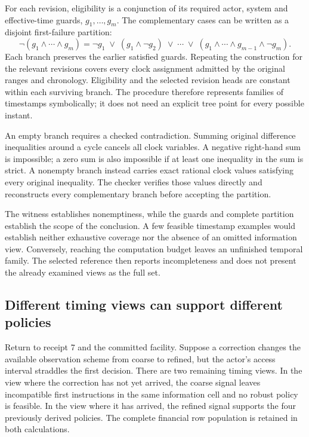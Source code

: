 For each revision, eligibility is a conjunction of its required actor, system and effective-time guards, $g_1,\ldots,g_m$. The complementary cases can be written as a disjoint first-failure partition:
\begin{equation}
 \neg(g_1\land\cdots\land g_m)
 =\neg g_1\;\lor\;(g_1\land\neg g_2)\;\lor\;\cdots\;\lor\;
 (g_1\land\cdots\land g_{m-1}\land\neg g_m).
 \label{eq:temporal-first-failure}
\end{equation}
Each branch preserves the earlier satisfied guards. Repeating the construction for the relevant revisions covers every clock assignment admitted by the original ranges and chronology. Eligibility and the selected revision heads are constant within each surviving branch. The procedure therefore represents families of timestamps symbolically; it does not need an explicit tree point for every possible instant.

An empty branch requires a checked contradiction. Summing original difference inequalities around a cycle cancels all clock variables. A negative right-hand sum is impossible; a zero sum is also impossible if at least one inequality in the sum is strict. A nonempty branch instead carries exact rational clock values satisfying every original inequality. The checker verifies those values directly and reconstructs every complementary branch before accepting the partition.

The witness establishes nonemptiness, while the guards and complete partition establish the scope of the conclusion. A few feasible timestamp examples would establish neither exhaustive coverage nor the absence of an omitted information view. Conversely, reaching the computation budget leaves an unfinished temporal family. The selected reference then reports incompleteness and does not present the already examined views as the full set.

\subsection{Different timing views can support different policies}

Return to receipt 7 and the committed facility. Suppose a correction changes the available observation scheme from coarse to refined, but the actor's access interval straddles the first decision. There are two remaining timing views. In the view where the correction has not yet arrived, the coarse signal leaves incompatible first instructions in the same information cell and no robust policy is feasible. In the view where it has arrived, the refined signal supports the four previously derived policies. The complete financial row population is retained in both calculations.

